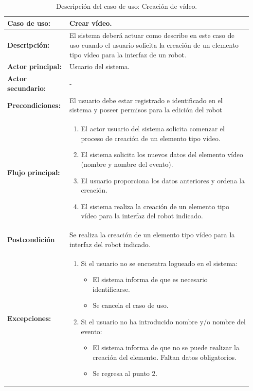 \begin{table}[H]
  \begin{center}
    \begin{tabular}{|p{3.5cm}|p{10cm}|}
      \hline
      {\textbf{Caso de uso:}} & { Crear vídeo.} \\
      \hline
      {\textbf{Descripción:}} & { El sistema deberá actuar como describe en este caso de uso cuando el usuario solicita la creación de un elemento tipo vídeo para la interfaz de un robot.} \\
     \hline
      {\textbf{Actor principal:}} & { Usuario del sistema.} \\
      \hline
      {\textbf{Actor secundario:}} & { - } \\
      \hline
      {\textbf{Precondiciones:}} & { El usuario debe estar registrado e identificado en el sistema y poseer permisos para la edición del robot } \\
     \hline   
    {\textbf{Flujo principal:}} & { 
      \begin{enumerate}
	\item El actor usuario del sistema solicita comenzar el proceso de creación de un elemento tipo vídeo.
	\item El sistema solicita los nuevos datos del elemento vídeo (nombre y nombre del evento).
	\item El usuario proporciona los datos anteriores y ordena la creación.
	\item El sistema realiza la creación de un elemento tipo vídeo para la interfaz del robot indicado.
      \end{enumerate}
      } \\
     \hline
     {\textbf{Postcondición}} & {Se realiza la creación de un elemento tipo vídeo para la interfaz del robot indicado.}\\
     \hline
      {\textbf{Excepciones:}} & {
	\begin{enumerate}
	\item Si el usuario no se encuentra logueado en el sistema:
	\begin{itemize}
	  \item El sistema informa de que es necesario identificarse.
	  \item Se cancela el caso de uso.
	\end{itemize}
	\item Si el usuario no ha introducido nombre y/o nombre del evento:
	  \begin{itemize}
	    \item El sistema informa de que no se puede realizar la creación del elemento. Faltan datos obligatorios.
	    \item Se regresa al punto 2.
	  \end{itemize}
	\end{enumerate}
	}\\
      \hline
    \end{tabular}
  \end{center}
\caption{Descripción del caso de uso: Creación de vídeo.}
\end{table}


